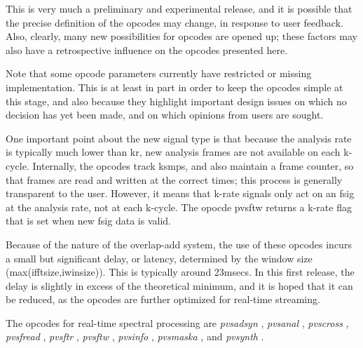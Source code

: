   This is very much a preliminary and experimental release, and it is possible that the precise definition of the opcodes may change, in response to user feedback. Also, clearly, many new possibilities for opcodes are opened up; these factors may also have a retrospective influence on the opcodes presented here. 


  Note that some opcode parameters currently have restricted or missing implementation. This is at least in part in order to keep the opcodes simple at this stage, and also because they highlight important design issues on which no decision has yet been made, and on which opinions from users are sought. 


  One important point about the new signal type is that because the analysis rate is typically much lower than kr, new analysis frames are not available on each k-cycle. Internally, the opcodes track ksmps, and also maintain a frame counter, so that frames are read and written at the correct times; this process is generally transparent to the user. However, it means that k-rate signals only act on an fsig at the analysis rate, not at each k-cycle. The opocde pvsftw returns a k-rate flag that is set when new fsig data is valid. 


  Because of the nature of the overlap-add system, the use of these opcodes incurs a small but significant delay, or latency, determined by the window size (max(ifftsize,iwinsize)). This is typically around 23msecs. In this first release, the delay is slightly in excess of the theoretical minimum, and it is hoped that it can be reduced, as the opcodes are further optimized for real-time streaming. 


  The opcodes for real-time spectral processing are \emph{pvsadsyn}
, \emph{pvsanal}
, \emph{pvscross}
, \emph{pvsfread}
, \emph{pvsftr}
, \emph{pvsftw}
, \emph{pvsinfo}
, \emph{pvsmaska}
, and \emph{pvsynth}
. 


\begin{comment}
\begin{tabular}{lcr}
Previous &Home &Next \\
Spectral Processing &Up &Zak Patch System

\end{tabular}



\end{comment}
